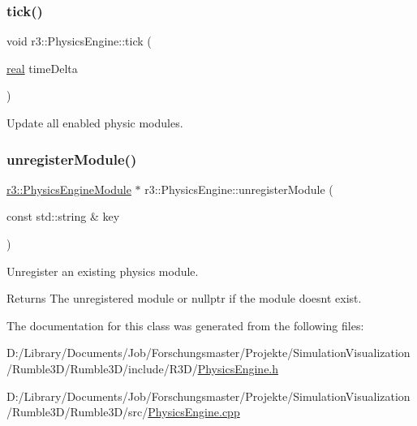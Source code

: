 \subsubsection{\texorpdfstring{tick()}{tick()}}
{\footnotesize\ttfamily void r3\+::\+Physics\+Engine\+::tick (\begin{DoxyParamCaption}\item[{\mbox{\hyperlink{namespacer3_ab2016b3e3f743fb735afce242f0dc1eb}{real}}}]{time\+Delta }\end{DoxyParamCaption})}

Update all enabled physic modules. \mbox{\label{classr3_1_1_physics_engine_a54dfdfda1b3f7eb33e9603d247f45aa8}} 
\subsubsection{\texorpdfstring{unregister\+Module()}{unregisterModule()}}
{\footnotesize\ttfamily \mbox{\hyperlink{classr3_1_1_physics_engine_module}{r3\+::\+Physics\+Engine\+Module}} $\ast$ r3\+::\+Physics\+Engine\+::unregister\+Module (\begin{DoxyParamCaption}\item[{const std\+::string \&}]{key }\end{DoxyParamCaption})}

Unregister an existing physics module. \begin{DoxyReturn}{Returns}
The unregistered module or nullptr if the module doesn\textquotesingle{}t exist. 
\end{DoxyReturn}


The documentation for this class was generated from the following files\+:\begin{DoxyCompactItemize}
\item 
D\+:/\+Library/\+Documents/\+Job/\+Forschungsmaster/\+Projekte/\+Simulation\+Visualization/\+Rumble3\+D/\+Rumble3\+D/include/\+R3\+D/\mbox{\hyperlink{_physics_engine_8h}{Physics\+Engine.\+h}}\item 
D\+:/\+Library/\+Documents/\+Job/\+Forschungsmaster/\+Projekte/\+Simulation\+Visualization/\+Rumble3\+D/\+Rumble3\+D/src/\mbox{\hyperlink{_physics_engine_8cpp}{Physics\+Engine.\+cpp}}\end{DoxyCompactItemize}
